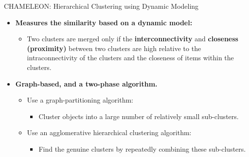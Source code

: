 \begin{frame}{CHAMELEON: Hierarchical Clustering using Dynamic Modeling}
	\begin{itemize}
		\item \textbf{Measures the similarity based on a dynamic model:}
		      \begin{itemize}
			      \item Two clusters are merged only if the
			            \textbf{interconnectivity} and \textbf{closeness (proximity)}
			            between two clusters are high relative to the intraconnectivity
			            of the clusters and the closeness of items within the clusters.
		      \end{itemize}
		\item \textbf{Graph-based, and a two-phase algorithm.}
		      \begin{itemize}
			      \item Use a graph-partitioning algorithm:
			            \begin{itemize}
				            \item Cluster objects into a large number of relatively
				                  small sub-clusters.
			            \end{itemize}
			      \item Use an agglomerative hierarchical clustering algorithm:
			            \begin{itemize}
				            \item Find the genuine clusters by repeatedly combining
				                  these sub-clusters.
			            \end{itemize}
		      \end{itemize}
	\end{itemize}

\end{frame}

